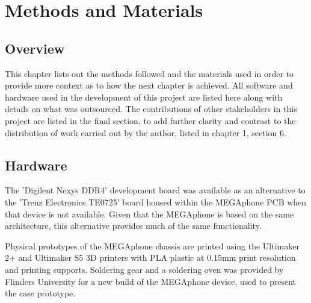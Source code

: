 
\chapter{Methods and Materials} %

\label{Chapter3} %

\section{Overview}

This chapter lists out the methods followed and the materials used in order to provide more context as to how the next chapter is achieved.
All software and hardware used in the development of this project are listed here along with details on what was outsourced.
The contributions of other stakeholders in this project are listed in the final section, to add further clarity and contrast to the distribution of work carried out by the author, listed in chapter 1, section 6.

\section{Hardware}

The 'Digilent Nexys DDR4' development board was available as an alternative to the 'Trenz Electronics TE0725' board housed within the MEGAphone PCB when that device is not available.
Given that the MEGAphone is based on the same architecture, this alternative provides much of the same functionality.

Physical prototypes of the MEGAphone chassis are printed using the Ultimaker 2+ and Ultimaker S5 3D printers with PLA plastic at 0.15mm print resolution and printing supports.
Soldering gear and a soldering oven was provided by Flinders University for a new build of the MEGAphone device, used to present the case prototype.

